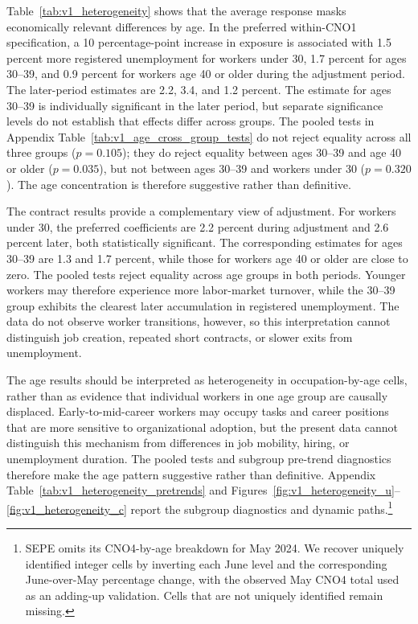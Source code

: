 \documentclass[11pt]{article}
\begin{document}
Table~\ref{tab:v1_heterogeneity} shows that the average response masks economically relevant differences by age. In the preferred within-CNO1 specification, a 10 percentage-point increase in exposure is associated with 1.5 percent more registered unemployment for workers under 30, 1.7 percent for ages 30--39, and 0.9 percent for workers age 40 or older during the adjustment period. The later-period estimates are 2.2, 3.4, and 1.2 percent. The estimate for ages 30--39 is individually significant in the later period, but separate significance levels do not establish that effects differ across groups. The pooled tests in Appendix Table~\ref{tab:v1_age_cross_group_tests} do not reject equality across all three groups (\(p=0.105\)); they do reject equality between ages 30--39 and age 40 or older (\(p=0.035\)), but not between ages 30--39 and workers under 30 (\(p=0.320\)). The age concentration is therefore suggestive rather than definitive.

The contract results provide a complementary view of adjustment. For workers under 30, the preferred coefficients are 2.2 percent during adjustment and 2.6 percent later, both statistically significant. The corresponding estimates for ages 30--39 are 1.3 and 1.7 percent, while those for workers age 40 or older are close to zero. The pooled tests reject equality across age groups in both periods. Younger workers may therefore experience more labor-market turnover, while the 30--39 group exhibits the clearest later accumulation in registered unemployment. The data do not observe worker transitions, however, so this interpretation cannot distinguish job creation, repeated short contracts, or slower exits from unemployment.

The age results should be interpreted as heterogeneity in occupation-by-age cells, rather than as evidence that individual workers in one age group are causally displaced. Early-to-mid-career workers may occupy tasks and career positions that are more sensitive to organizational adoption, but the present data cannot distinguish this mechanism from differences in job mobility, hiring, or unemployment duration. The pooled tests and subgroup pre-trend diagnostics therefore make the age pattern suggestive rather than definitive. Appendix Table~\ref{tab:v1_heterogeneity_pretrends} and Figures~\ref{fig:v1_heterogeneity_u}--\ref{fig:v1_heterogeneity_c} report the subgroup diagnostics and dynamic paths.\footnote{SEPE omits its CNO4-by-age breakdown for May 2024. We recover uniquely identified integer cells by inverting each June level and the corresponding June-over-May percentage change, with the observed May CNO4 total used as an adding-up validation. Cells that are not uniquely identified remain missing.}
\end{document}
